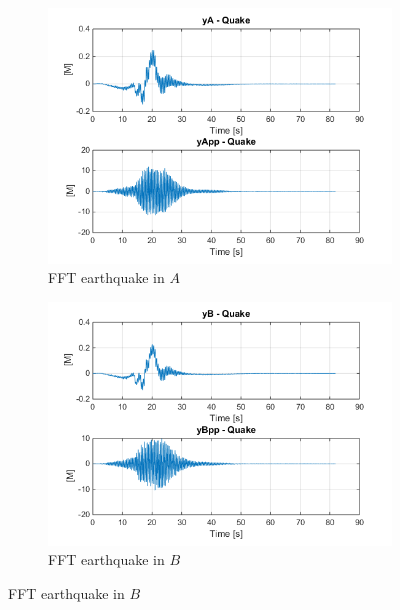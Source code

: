 \documentclass[10pt,a4paper,final]{report}
\begin{document}
\begin{figure}[h]
        \centering
        \begin{subfigure}[t]{0.5\textwidth}
                \includegraphics[width=\textwidth]{earthquake6}
                \caption{FFT earthquake in $A$}
                \label{fig:earthquake6}
        \end{subfigure}%
        \begin{subfigure}[t]{0.5\textwidth}
                \includegraphics[width=\textwidth]{earthquake7}
                \caption{FFT earthquake in $B$}
                \label{fig:earthquake7}
        \end{subfigure}
         \label{fig:earthquake67}
\end{figure}
\newpage
\end{document}
